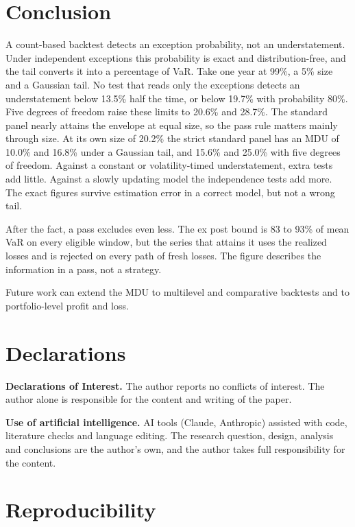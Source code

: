\documentclass[11pt]{article}
\begin{document}
\section{Conclusion}
\label{sec:conclusion}

A count-based backtest detects an exception probability, not an
understatement. Under independent exceptions this probability is exact and
distribution-free, and the tail converts it into a percentage of VaR. Take one
year at 99\%, a 5\% size and a Gaussian tail. No test that reads only the
exceptions detects an understatement below 13.5\% half the time, or below
19.7\% with probability 80\%. Five
degrees of freedom raise these limits to 20.6\% and 28.7\%. The standard
panel nearly attains the envelope at equal size, so the pass rule matters
mainly through size. At its own size of 20.2\% the strict standard panel has an MDU of
10.0\% and 16.8\% under a Gaussian tail, and 15.6\% and 25.0\% with five
degrees of freedom. Against a constant or volatility-timed
understatement, extra tests add little. Against a slowly updating model the
independence tests add more. The exact figures survive estimation error in a correct model, but not a
wrong tail.

After the fact, a pass excludes even less. The ex post bound is 83 to 93\% of
mean VaR on every eligible window, but the series that attains it uses the
realized losses and is rejected on every path of fresh losses. The figure
describes the information in a pass, not a strategy.

Future work can extend the MDU to multilevel and comparative backtests
\citep{kratz2018, nolde2017} and to portfolio-level profit and loss.

\section*{Declarations}

\textbf{Declarations of Interest.} The author reports no conflicts of interest.
The author alone is responsible for the content and writing of the paper.

\textbf{Use of artificial intelligence.} AI tools (Claude, Anthropic) assisted with code,
literature checks and language editing. The research question, design, analysis
and conclusions are the author's own, and the author takes full responsibility
for the content.

\appendix

\section{Reproducibility}
\label{app:repro}
\end{document}
